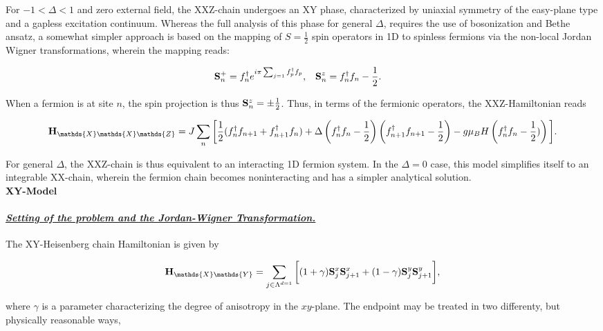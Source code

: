 \documentclass{homework}
\begin{document}
For $-1 < \Delta < 1$ and zero external field, the XXZ-chain undergoes an XY phase, characterized by uniaxial symmetry of the easy-plane type and a gapless excitation continuum. Whereas the full analysis of this phase for general $\Delta$, requires the use of bosonization and Bethe ansatz, a somewhat simpler approach is based on the mapping of $S = \frac{1}{2}$ spin operators in 1D to spinless fermions via the non-local Jordan Wigner transformations, wherein the mapping reads:

\begin{align}
    {\bf S}_{n}^+ &= f_n^\dagger e^{i\pi \sum_{j = 1} f_p^\dagger f_p}, & {\bf S}_n^z &= f_n^\dagger f_n - \frac{1}{2}.
\end{align}

When a fermion is at site $n$, the spin projection is thus ${\bf S}_n^z = \pm \frac{1}{2}$. Thus, in terms of the fermionic operators, the XXZ-Hamiltonian reads 

\begin{equation}
    {\bf H}_{\mathds{X}\mathds{X}\mathds{Z}} = J \sum_{n} \bigg[ \frac{1}{2} (f_n^\dagger f_{n+1} + f_{n+1}^\dagger f_n) + \Delta \left(f_n^\dagger f_n - \frac{1}{2}\right) \left(f_{n+1}^\dagger f_{n+1} - \frac{1}{2}\right) - g\mu_B H \left(f_n^\dagger f_n - \frac{1}{2})\right) \bigg].
    \label{XXZ fermionic hamiltonian}
\end{equation}

For general $\Delta$, the XXZ-chain is thus equivalent to an interacting 1D fermion system. In the $\Delta = 0$ case, this model simplifies itself to an integrable XX-chain, wherein the fermion chain becomes noninteracting and has a simpler analytical solution. \\

\textbf{XY-Model}

\paragraph{\textit{\underline{Setting of the problem and the Jordan-Wigner Transformation.}}} 

The XY-Heisenberg chain Hamiltonian is given by 

\begin{equation}
    {\bf H}_{\mathds{X}\mathds{Y}} = \sum_{j \in \Lambda^{d=1}} \bigg[(1+\gamma) \spin_{j}^x\spin_{j+1}^x + (1-\gamma) \spin_{j}^y\spin_{j+1}^y \bigg],
\end{equation}

where $\gamma$ is a parameter characterizing the degree of anisotropy in the $xy$-plane. The endpoint may be treated in two differenty, but physically reasonable ways, 
\end{document}
